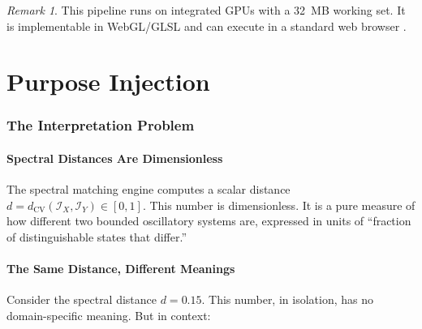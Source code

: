 \documentclass[11pt,twocolumn,a4paper]{article}
\theoremstyle{definition}
\theoremstyle{remark}
\newtheorem{remark}[theorem]{Remark}
\newcommand{\dcv}{d_{\mathrm{CV}}}
\begin{document}
\begin{remark}
This pipeline runs on integrated GPUs with a 32~MB working set.  It is implementable in WebGL/GLSL and can execute in a standard web browser \citep{marrin2011webgl}.
\end{remark}





\part{Purpose Injection}

\section{The Interpretation Problem}\label{sec:interpretation-problem}

\subsection{Spectral Distances Are Dimensionless}

The spectral matching engine computes a scalar distance $d = \dcv(\mathcal{I}_X, \mathcal{I}_Y) \in [0, 1]$.  This number is dimensionless.  It is a pure measure of how different two bounded oscillatory systems are, expressed in units of ``fraction of distinguishable states that differ.''

\subsection{The Same Distance, Different Meanings}

Consider the spectral distance $d = 0.15$.  This number, in isolation, has no domain-specific meaning.  But in context:
\end{document}
